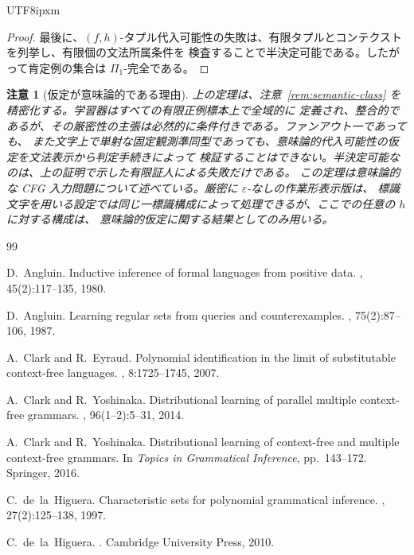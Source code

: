 \documentclass[10pt,a4paper]{article}
\newtheorem{remark}[theorem]{注意}
\theoremstyle{remark}
\newcommand{\eps}{\varepsilon}
\begin{document}
\begin{CJK}{UTF8}{ipxm}
\begin{proof}
最後に、\((f,h)\)-タプル代入可能性の失敗は、有限タプルとコンテクストを列挙し、有限個の文法所属条件を
検査することで半決定可能である。したがって肯定例の集合は \(\Pi_1\)-完全である。
\end{proof}

\begin{remark}[仮定が意味論的である理由]
\label{rem:promise-undecidable}
上の定理は、注意~\ref{rem:semantic-class} を精密化する。学習器はすべての有限正例標本上で全域的に
定義され、整合的であるが、その厳密性の主張は必然的に条件付きである。ファンアウト一であっても、
また文字上で単射な固定観測準同型であっても、意味論的代入可能性の仮定を文法表示から判定手続きによって
検証することはできない。半決定可能なのは、上の証明で示した有限証人による失敗だけである。
この定理は意味論的な CFG 入力問題について述べている。厳密に \(\eps\)-なしの作業形表示版は、
標識文字を用いる設定では同じ一標識構成によって処理できるが、ここでの任意の \(h\) に対する構成は、
意味論的仮定に関する結果としてのみ用いる。
\end{remark}

\begin{thebibliography}{99}

D.~Angluin.
\newblock Inductive inference of formal languages from positive data.
, 45(2):117--135, 1980.

D.~Angluin.
\newblock Learning regular sets from queries and counterexamples.
, 75(2):87--106, 1987.

A.~Clark and R.~Eyraud.
\newblock Polynomial identification in the limit of substitutable context-free
languages.
, 8:1725--1745, 2007.

A.~Clark and R.~Yoshinaka.
\newblock Distributional learning of parallel multiple context-free grammars.
, 96(1--2):5--31, 2014.

A.~Clark and R.~Yoshinaka.
\newblock Distributional learning of context-free and multiple context-free
grammars.
\newblock In {\em Topics in Grammatical Inference}, pp.~143--172. Springer,
2016.

C.~de~la~Higuera.
\newblock Characteristic sets for polynomial grammatical inference.
, 27(2):125--138, 1997.

C.~de~la~Higuera.
.
\newblock Cambridge University Press, 2010.


\end{thebibliography}
\end{CJK}
\end{document}
